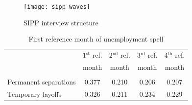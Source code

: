 \documentclass[12pt]{article}
\begin{document}
  \begin{figure}
  \caption{SIPP interview structure}
    \begin{center}
      \texttt{[image: sipp\_waves]}

% 
%         
%     
% 
% 
%         
%         
    \end{center}
  \end{figure}

    \begin{table}
      \caption{First reference month of unemployment spell}
      \begin{center}
  \begin{tabular}{l|cccc}
    & \multicolumn{1}{c}{1$^\text{st}$ ref.}
    & \multicolumn{1}{c}{2$^\text{nd}$ ref.}
    & \multicolumn{1}{c}{3$^\text{rd}$ ref.}
    & \multicolumn{1}{c}{4$^\text{th}$ ref.} \\
    & \multicolumn{1}{c}{month}
    & \multicolumn{1}{c}{month}
    & \multicolumn{1}{c}{month}
    & \multicolumn{1}{c}{month} \\ \hline \\[-1em]
    Permanent separations & 0.377 &  0.210 &  
    0.206 &   0.207 \\[.35em]
    Temporary layoffs     & 0.326 &  0.211 &  0.234 &   0.229 \\[.35em]
    \hline
  \end{tabular}
      \end{center}
    \end{table}
\end{document}
